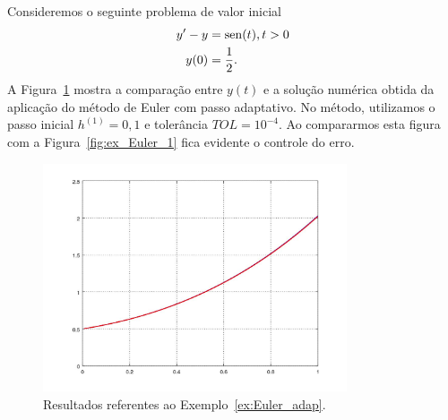 \begin{ex}\label{ex:Euler_adap}
  Consideremos o seguinte problema de valor inicial
  \begin{align}
    y' - y &= \operatorname{sen}(t), t>0\\
    y(0) &= \frac{1}{2}.
  \end{align}
  A Figura~\ref{fig:ex_Euler_adap} mostra a comparação entre $y(t)$ e a solução numérica obtida da aplicação do método de Euler com passo adaptativo. No método, utilizamos o passo inicial $h^{(1)}=0,1$ e tolerância $TOL=10^{-4}$. Ao compararmos esta figura com a Figura~\eqref{fig:ex_Euler_1} fica evidente o controle do erro.

  \begin{figure}[h!]
    \centering
    \includegraphics[width=0.8\textwidth]{./cap_pvi/dados/ex_Euler_adap/ex_Euler_adap}
    \caption{Resultados referentes ao Exemplo~\ref{ex:Euler_adap}.}
    \label{fig:ex_Euler_adap}
  \end{figure}






 
      
  



\end{ex}

